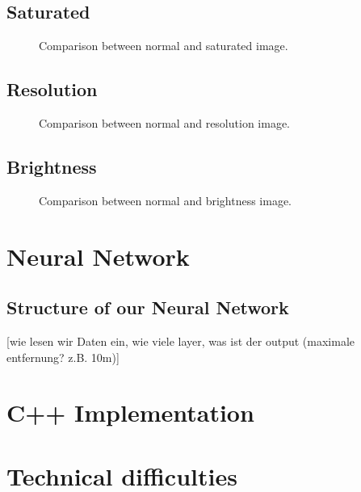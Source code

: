 \subsection{Saturated}

\begin{figure}[h!]
	\centering
	\caption{Comparison between normal and saturated image.}
	\label{pic:implementation_opencv_saturated}
\end{figure}

\subsection{Resolution}

\begin{figure}[h!]
	\centering
	\caption{Comparison between normal and resolution image.}
	\label{pic:implementation_opencv_resolution}
\end{figure}

\subsection{Brightness}

\begin{figure}[h!]
	\centering
	\caption{Comparison between normal and brightness image.}
	\label{pic:implementation_opencv_brightness}
\end{figure}

\section{Neural Network}
\subsection{Structure of our Neural Network}

[wie lesen wir Daten ein, wie viele layer, was ist der output (maximale entfernung? z.B. 10m)]

\section{C++ Implementation}

\section{Technical difficulties}

\filbreak